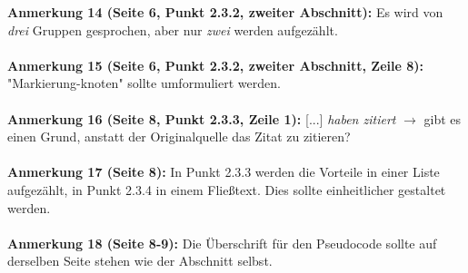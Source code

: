 \documentclass[a4paper,12pt]{book}
\begin{document}
\noindent
\textbf{Anmerkung 14 (Seite 6, Punkt 2.3.2, zweiter Abschnitt):}
Es wird von \emph{drei} Gruppen gesprochen, aber nur \emph{zwei} werden aufgezählt. \\
\\

\noindent
\textbf{Anmerkung 15 (Seite 6, Punkt 2.3.2, zweiter Abschnitt, Zeile 8):}
"Markierung-knoten" sollte umformuliert werden. \\
\\

\noindent
\textbf{Anmerkung 16 (Seite 8, Punkt 2.3.3, Zeile 1):}
[...] \emph{haben zitiert} $\rightarrow$ gibt es einen Grund, anstatt der Originalquelle das Zitat zu zitieren? \\
\\

\noindent
\textbf{Anmerkung 17 (Seite 8):}
In Punkt 2.3.3 werden die Vorteile in einer Liste aufgezählt, in Punkt 2.3.4 in einem Fließtext. Dies sollte einheitlicher gestaltet werden. \\
\\

\noindent
\textbf{Anmerkung 18 (Seite 8-9):}
Die Überschrift für den Pseudocode sollte auf derselben Seite stehen wie der Abschnitt selbst. \\
\\
\end{document}
